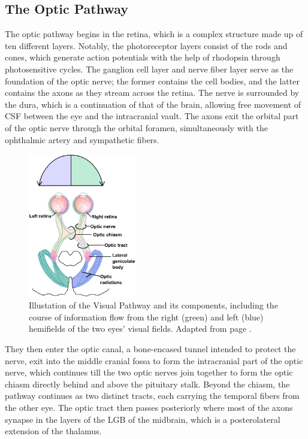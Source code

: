 \subsection{The Optic Pathway}

The optic pathway begins in the retina, which is a complex structure made up of ten different layers. Notably, the photoreceptor layers consist of the rods and cones, which generate action potentials with the help of rhodopsin through photosensitive cycles. The ganglion cell layer and nerve fiber layer serve as the foundation of the optic nerve; the former contains the cell bodies, and the latter contains the axons as they stream across the retina. The nerve is surrounded by the dura, which is a continuation of that of the brain, allowing free movement of \gls{CSF} between the eye and the intracranial vault. The axons exit the orbital part of the optic nerve through the orbital foramen, simultaneously with the ophthalmic artery and sympathetic fibers.

\clearpage %

\begin{figure}
	\centering
	\includegraphics[width = 0.42\textwidth]{assets/images/Optic_Pathway.jpg}
	\caption[The Visual Pathway]{Illustation of the Visual Pathway and its components, including the course of information flow from the right (green) and left (blue) hemifields of the two eyes' visual fields. Adapted from page \cite{optic_nerve}.}
	\label{fig:OpticPath}
\end{figure}

They then enter the optic canal, a bone-encased tunnel intended to protect the nerve, exit into the middle cranial fossa to form the intracranial part of the optic nerve, which continues till the two optic nerves join together to form the optic chiasm directly behind and above the pituitary stalk. Beyond the chiasm, the pathway continues as two distinct tracts, each carrying the temporal fibers from the other eye. The optic tract then passes posteriorly where most of the axons synapse in the layers of the \gls{LGB} of the midbrain, which is a posterolateral extension of the thalamus.

